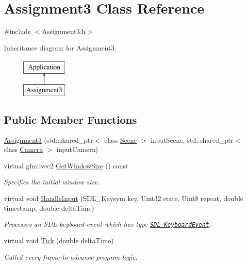 \hypertarget{class_assignment3}{}\section{Assignment3 Class Reference}
\label{class_assignment3}


{\ttfamily \#include $<$Assignment3.\+h$>$}

Inheritance diagram for Assignment3\+:\begin{figure}[H]
\begin{center}
\leavevmode
\includegraphics[height=2.000000cm]{class_assignment3}
\end{center}
\end{figure}
\subsection*{Public Member Functions}
\begin{DoxyCompactItemize}
\item 
\hyperlink{class_assignment3_adb8e9ac0681c600affc3370f5e5422b2}{Assignment3} (std\+::shared\+\_\+ptr$<$ class \hyperlink{class_scene}{Scene} $>$ input\+Scene, std\+::shared\+\_\+ptr$<$ class \hyperlink{class_camera}{Camera} $>$ input\+Camera)
\item 
virtual glm\+::vec2 \hyperlink{class_assignment3_aec48ba5500d906963fdac555ee47cb72}{Get\+Window\+Size} () const
\begin{DoxyCompactList}\small\item\em Specifies the initial window size. \end{DoxyCompactList}\item 
virtual void \hyperlink{class_assignment3_a1cc65ca321f39eb7092959b2dada8d31}{Handle\+Input} (S\+D\+L\+\_\+\+Keysym key, Uint32 state, Uint8 repeat, double timestamp, double delta\+Time)
\begin{DoxyCompactList}\small\item\em Processes an S\+DL keyboard event which has type \href{https://wiki.libsdl.org/SDL_KeyboardEvent}{\tt S\+D\+L\+\_\+\+Keyboard\+Event}. \end{DoxyCompactList}\item 
virtual void \hyperlink{class_assignment3_a11256b6e7b38ab24baa92729cfb8ffe2}{Tick} (double delta\+Time)
\begin{DoxyCompactList}\small\item\em Called every frame to advance program logic. \end{DoxyCompactList}\end{DoxyCompactItemize}

